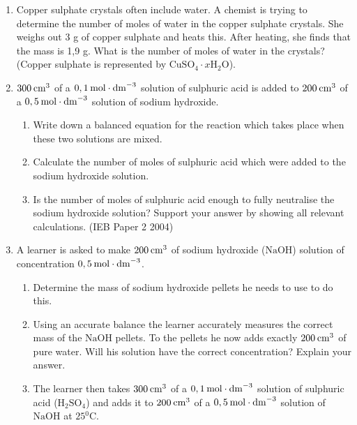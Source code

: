 \begin{enumerate}[noitemsep, label=\textbf{\arabic*}. ]
                \item Copper sulphate crystals often include water. A chemist is trying to determine the number of moles of water in the copper sulphate crystals. She weighs out 3 g of copper sulphate and heats this. After heating, she finds that the mass is 1,9 g. What is the number of moles of water in the crystals? (Copper sulphate is represented by ${\mathrm{CuSO}}_{4}\cdot x{\mathrm{H}}_{2}\mathrm{O}$).        \label{m38712*uid147}\item $300\phantom{\rule{2pt}{0ex}}{\mathrm{cm}}^{3}$ of a $0,1\phantom{\rule{2pt}{0ex}}\mathrm{mol}\ensuremath{\cdot}{\mathrm{dm}}^{-3}$ solution of sulphuric acid is added to $200\phantom{\rule{2pt}{0ex}}{\mathrm{cm}}^{3}$ of a $0,5\phantom{\rule{2pt}{0ex}}\mathrm{mol}\ensuremath{\cdot}{\mathrm{dm}}^{-3}$ solution of sodium hydroxide.
\label{m38712*id286663}\begin{enumerate}[noitemsep, label=\textbf{\alph*}. ] 
            \label{m38712*uid148}\item Write down a balanced equation for the reaction which takes place when these two solutions are mixed.
\label{m38712*uid149}\item Calculate the number of moles of sulphuric acid which were added to the sodium hydroxide solution.
\label{m38712*uid150}\item Is the number of moles of sulphuric acid enough to fully neutralise the sodium hydroxide solution? Support your answer by showing all relevant calculations.
(IEB Paper 2 2004)
\end{enumerate}
                \label{m38712*uid155}\item A learner is asked to make $200\phantom{\rule{2pt}{0ex}}{\mathrm{cm}}^{3}$ of sodium hydroxide ($\mathrm{NaOH}$) solution of concentration $0,5\phantom{\rule{2pt}{0ex}}\mathrm{mol}\ensuremath{\cdot}{\mathrm{dm}}^{-3}$.
\label{m38712*id286969}\begin{enumerate}[noitemsep, label=\textbf{\alph*}. ] 
            \label{m38712*uid156}\item Determine the mass of sodium hydroxide pellets he needs to use to do this.
\label{m38712*uid157}\item Using an accurate balance the learner accurately measures the correct mass of the $\mathrm{NaOH}$ pellets. To the pellets he now adds exactly $200\phantom{\rule{2pt}{0ex}}{\mathrm{cm}}^{3}$ of pure water. Will his solution have the correct concentration? Explain your answer.\item The learner then takes $300\phantom{\rule{2pt}{0ex}}{\mathrm{cm}}^{3}$ of a $0,1\phantom{\rule{2pt}{0ex}}\mathrm{mol}\ensuremath{\cdot}{\mathrm{dm}}^{-3}$ solution of sulphuric acid ($\mathrm{H}{}_{2}\mathrm{SO}{}_{4}$) and adds it to $200\phantom{\rule{2pt}{0ex}}{\mathrm{cm}}^{3}$ of a $0,5\phantom{\rule{2pt}{0ex}}\mathrm{mol}\ensuremath{\cdot}{\mathrm{dm}}^{-3}$ solution of $\mathrm{NaOH}$ at $25{}^{0}\mathrm{C}$.

\end{enumerate}
\end{enumerate}
